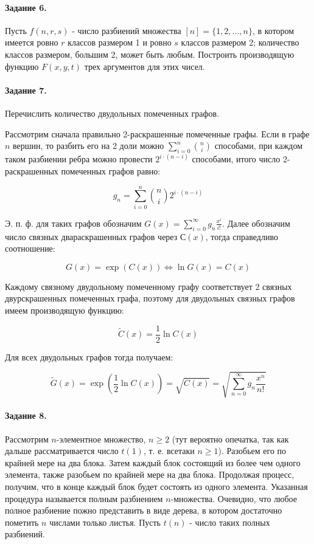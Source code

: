 \documentclass[a4paper,12pt]{article}
\begin{document}
\paragraph{Задание 6.} Пусть $f\left(n,r,s\right)$ - число разбиений множества $\left[n\right] = \lbrace1, 2, ..., n\rbrace$, в котором имеется ровно $r$ классов размером 1 и ровно $s$ классов размером 2; количество классов размером, большим 2, может быть любым. Построить производящую функцию $F\left(x, y, t\right)$ трех аргументов для этих чисел.

\begin{Solution}
\end{Solution}

\paragraph{Задание 7.} Перечислить количество двудольных помеченных графов.

\begin{Solution}
Рассмотрим сначала правильно 2-раскрашенные помеченные графы. Если в графе $n$ вершин, то разбить его на 2 доли можно $\sum_{i=0}^n \binom{n}{i}$ способами, при каждом таком разбиении ребра можно провести $2^{i\cdot\left(n-i\right)}$ способами, итого число 2-раскрашенных помеченных графов равно:

\[
	g_n = \sum_{i=0}^n \binom{n}{i} 2^{i\cdot\left(n-i\right)}
\]

Э. п. ф. для таких графов обозначим $G\left(x\right) = \sum_{i=0}^{\infty} g_n \frac{x^i}{i!}$. Далее обозначим число связных двараскрашенных графов через $С\left(x\right)$, тогда справедливо соотношение:

\[
	G\left(x\right) = \exp\left(C\left(x\right)\right) \Leftrightarrow \ln G\left(x\right) = C\left(x\right)
\]

Каждому связному двудольному помеченному графу соответствует 2 связных двурскрашенных помеченных графа, поэтому для двудольных связных графов имеем производящую функцию:

\[
	\tilde C\left(x\right) = \frac{1}{2} \ln C\left(x\right)
\]

Для всех двудольных графов тогда получаем:

\[
	\tilde G\left(x\right) = \exp\left(\frac{1}{2} \ln C\left(x\right)\right) = \sqrt{C\left(x\right)} = \sqrt{\sum_{n=0}^{\infty} g_n \frac{x^n}{n!}}
\]
\end{Solution}

\paragraph{Задание 8.} Рассмотрим $n$-элементное множество, $n \ge 2$ (тут вероятно опечатка, так как дальше рассматривается число $t\left(1\right)$, т. е. всетаки $n \ge 1$). Разобьем его по крайней мере на два блока. Затем каждый блок состоящий из более чем одного элемента, также разобьем по крайней мере на два блока. Продолжая процесс, получим, что в конце каждый блок будет состоять из одного элемента. Указанная процедура называется полным разбиением $n$-множества. Очевидно, что любое полное разбиение пожно представить в виде дерева, в котором достаточно пометить $n$ числами только листья. Пусть $t\left(n\right)$ - число таких полных разбиений.
\end{document}
